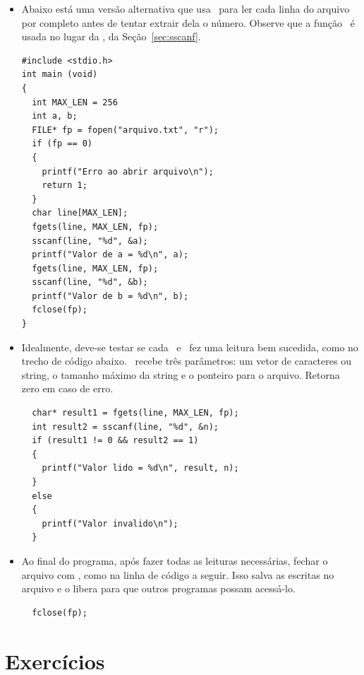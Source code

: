 \begin{itemize}
\item Abaixo está uma versão alternativa que usa \FGETS\ para ler cada linha do arquivo por completo antes de tentar extrair dela o número. Observe que a função \FGETS\ é usada no lugar da \GETS, da Seção~\ref{sec:sscanf}. \

\begin{lstlisting}
#include <stdio.h> 
int main (void)
{
  int MAX_LEN = 256
  int a, b;
  FILE* fp = fopen("arquivo.txt", "r");
  if (fp == 0)
  {
    printf("Erro ao abrir arquivo\n");
    return 1;
  }
  char line[MAX_LEN];
  fgets(line, MAX_LEN, fp);
  sscanf(line, "%d", &a);
  printf("Valor de a = %d\n", a);
  fgets(line, MAX_LEN, fp);
  sscanf(line, "%d", &b);
  printf("Valor de b = %d\n", b);
  fclose(fp);
}
\end{lstlisting}


\item Idealmente, deve-se testar se cada \FSCANF\ e \FGETS\ fez uma leitura bem sucedida, como no trecho de código abaixo. \FGETS\ recebe três parâmetros: um vetor de caracteres ou string, o tamanho máximo da string e o ponteiro para o arquivo. Retorna zero em caso de erro.

\begin{lstlisting}
  char* result1 = fgets(line, MAX_LEN, fp);
  int result2 = sscanf(line, "%d", &n);
  if (result1 != 0 && result2 == 1)
  {
    printf("Valor lido = %d\n", result, n);
  }
  else
  {
    printf("Valor invalido\n");
  }
\end{lstlisting}

\item Ao final do programa, após fazer todas as leituras necessárias, fechar o arquivo com \FCLOSE, como na linha de código a seguir. Isso salva as escritas no arquivo e o libera para que outros programas possam acessá-lo.

\begin{lstlisting}
  fclose(fp);
\end{lstlisting}

\end{itemize}


\section{Exercícios}

